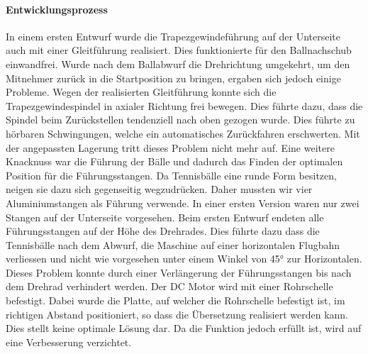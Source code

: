 \paragraph{Entwicklungsprozess\\}
In einem ersten Entwurf wurde die Trapezgewindeführung auf der Unterseite auch mit einer Gleitführung realisiert. Dies funktionierte für den Ballnachschub einwandfrei. Wurde nach dem Ballabwurf die Drehrichtung umgekehrt, um den Mitnehmer zurück in die Startposition zu bringen, ergaben sich jedoch einige Probleme. Wegen der realisierten Gleitführung konnte sich die Trapezgewindespindel in axialer Richtung frei bewegen. Dies führte dazu, dass die Spindel beim Zurückstellen tendenziell nach oben gezogen wurde. Dies führte zu hörbaren Schwingungen, welche ein automatisches Zurückfahren erschwerten. Mit der angepassten Lagerung tritt dieses Problem nicht mehr auf. 
Eine weitere Knacknuss war die Führung der Bälle und dadurch das Finden der optimalen Position für die Führungsstangen. Da Tennisbälle eine runde Form besitzen, neigen sie dazu sich gegenseitig wegzudrücken. Daher mussten wir vier Aluminiumstangen als Führung verwende. In einer ersten Version waren nur zwei Stangen auf der Unterseite vorgesehen. Beim ersten Entwurf endeten alle Führungsstangen auf der Höhe des Drehrades. Dies führte dazu dass die Tennisbälle nach dem Abwurf, die Maschine auf einer horizontalen Flugbahn verliessen und nicht wie vorgesehen unter einem Winkel von 45° zur Horizontalen. Dieses Problem konnte durch einer Verlängerung der Führungsstangen bis nach dem Drehrad verhindert werden. 
Der DC Motor wird mit einer Rohrschelle befestigt. Dabei wurde die Platte, auf welcher die Rohrschelle befestigt ist, im richtigen Abstand positioniert, so dass die Übersetzung realisiert werden kann. Dies stellt keine optimale Lösung dar. Da die Funktion jedoch erfüllt ist, wird auf eine Verbesserung verzichtet. 
